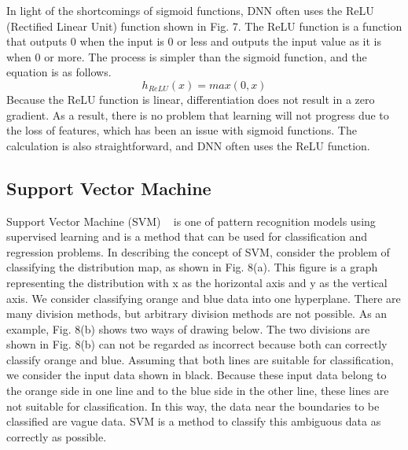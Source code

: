 In light of the shortcomings of sigmoid functions, DNN often uses the ReLU (Rectified Linear Unit) function shown in Fig. 7. The ReLU function is a function that outputs 0 when the input is 0 or less and outputs the input value as it is when 0 or more. The process is simpler than the sigmoid function, and the equation is as follows.
\begin{equation}
h_{ReLU}(x)=max(0,x)
\end{equation}
Because the ReLU function is linear, differentiation does not result in a zero gradient. As a result, there is no problem that learning will not progress due to the loss of features, which has been an issue with sigmoid functions. The calculation is also straightforward, and DNN often uses the ReLU function.

\subsection{Support Vector Machine}
Support Vector Machine (SVM) ~\cite{bib:Support-Vector-Networks} is one of pattern recognition models using supervised learning and is a method that can be used for classification and regression problems. In describing the concept of SVM, consider the problem of classifying the distribution map, as shown in Fig. 8(a). This figure is a graph representing the distribution with x as the horizontal axis and y as the vertical axis. We consider classifying orange and blue data into one hyperplane. There are many division methods, but arbitrary division methods are not possible. As an example, Fig. 8(b) shows two ways of drawing below. The two divisions are shown in Fig. 8(b) can not be regarded as incorrect because both can correctly classify orange and blue. Assuming that both lines are suitable for classification, we consider the input data shown in black. Because these input data belong to the orange side in one line and to the blue side in the other line, these lines are not suitable for classification. In this way, the data near the boundaries to be classified are vague data. SVM is a method to classify this ambiguous data as correctly as possible.
